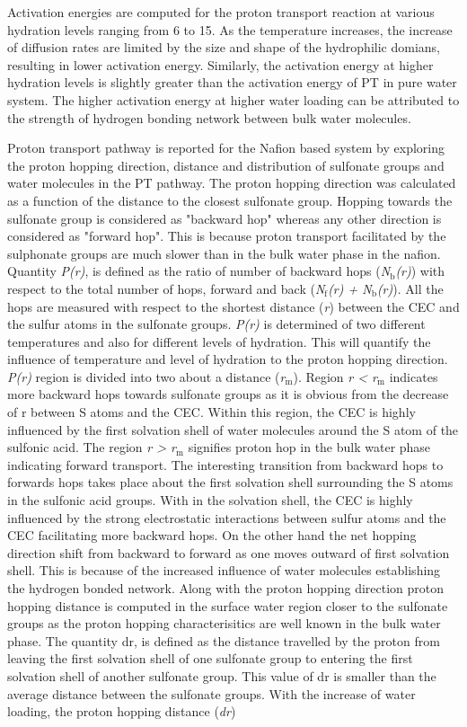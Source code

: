 \documentclass{article}
\begin{document}
Activation energies are computed for the proton transport reaction at various hydration levels ranging from 6 to 15. As the temperature increases, the increase of diffusion rates are limited by the size and shape of the hydrophilic domians, resulting in lower activation energy. Similarly, the activation energy at higher hydration levels is slightly greater than the activation energy of PT in pure water system. The higher activation energy at higher water loading can be attributed to the strength of hydrogen bonding network between bulk water molecules.

Proton transport pathway is reported for the Nafion based system by exploring the proton hopping direction, distance and distribution of sulfonate groups and water molecules in the PT pathway. The proton hopping direction was calculated as a function of the distance to the closest sulfonate group. Hopping towards the sulfonate group is considered as "backward hop" whereas any other direction is considered as "forward hop". This is because proton transport facilitated by the sulphonate groups are much slower than in the bulk water phase in the nafion. Quantity \emph{P(r)}, is defined as the ratio of number of backward hops (\emph{N$_{\text{b}}$(r)}) with respect to the total number of hops, forward and back (\emph{N$_{\text{f}}$(r) + N$_{\text{b}}$(r)}). All the hops are measured with respect to the shortest distance (\emph{r}) between the CEC and the sulfur atoms in the sulfonate groups. \emph{P(r)} is determined of two different temperatures and also for different levels of hydration. This will quantify the influence of temperature and level of hydration to the proton hopping direction. \emph{P(r)} region is divided into two about a distance (\emph{r$_{\text{m}}$}). Region \emph{r < r$_{\text{m}}$} indicates more backward hops towards sulfonate groups as it is obvious from the decrease of r between S atoms and the CEC. Within this region, the CEC is highly influenced by the first solvation shell of water molecules around the S atom of the sulfonic acid. The region \emph{r > r$_{\text{m}}$} signifies proton hop in the bulk water phase indicating forward transport. The interesting transition from backward hops to forwards hops takes place about the first solvation shell surrounding the S atoms in the sulfonic acid groups. With in the solvation shell, the CEC is highly influenced by the strong electrostatic interactions between sulfur atoms and the CEC facilitating more backward hops. On the other hand the net hopping direction shift from backward to forward as one moves outward of first solvation shell. This is because of the increased influence of water molecules establishing the hydrogen bonded network. Along with the proton hopping direction proton hopping distance is computed in the surface water region closer to the sulfonate groups as the proton hopping characterisitics are well known in the bulk water phase. The quantity dr, is defined as the distance travelled by the proton from leaving the first solvation shell of one sulfonate group to entering the first solvation shell of another sulfonate group. This value of dr is smaller than the average distance between the sulfonate groups. With the increase of water loading, the proton hopping distance (\emph{dr}) 
\end{document}
